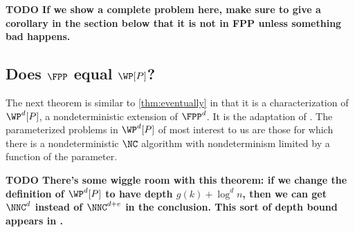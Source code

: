 \documentclass{article}
\newcommand{\todo}[1]{\textbf{TODO #1}}
\begin{document}
\todo{If we show a complete problem here, make sure to give a corollary in the section below that it is not in FPP unless something bad happens.}

\subsection{Does \texorpdfstring{$\FPP$}{FPP} equal \texorpdfstring{$\WP[P]$}{WP[P]}?}
\label{sec:fppwpp}

The next theorem is similar to \autoref{thm:eventually} in that it is a characterization of $\WP^d[P]$, a nondeterministic extension of $\FPP^d$.
It is the adaptation of \autocite[Proposition~3.7]{fg06}.
The parameterized problems in $\WP^d[P]$ of most interest to us are those for which there is a nondeterministic $\NC$ algorithm with nondeterminism limited by a function of the parameter.

\todo{
  There's some wiggle room with this theorem: if we change the definition of $\WP^d[P]$ to have depth $g(k) + \log^d n$, then we can get $\NNC^d$ instead of $\NNC^{d + e}$ in the conclusion.
  This sort of depth bound appears in \autocite{bst15}.
}
\end{document}
